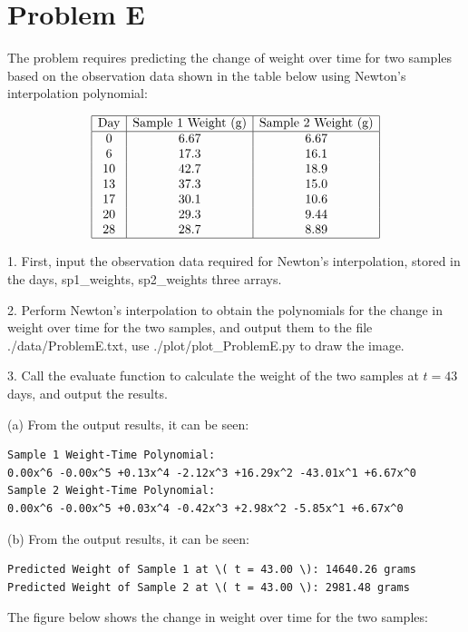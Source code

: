 \documentclass[a4paper]{article}
\begin{document}
\newpage
\section*{Problem E}

The problem requires predicting the change of weight over time for two samples based on the observation data shown in the table below using Newton's interpolation polynomial:

\[
\begin{array}{|c|c|c|}
\hline
\text{Day} & \text{Sample 1 Weight (g)} & \text{Sample 2 Weight (g)} \\
\hline
0 & 6.67 & 6.67 \\
6 & 17.3 & 16.1 \\
10 & 42.7 & 18.9 \\
13 & 37.3 & 15.0 \\
17 & 30.1 & 10.6 \\
20 & 29.3 & 9.44 \\
28 & 28.7 & 8.89 \\
\hline
\end{array}
\]

1. First, input the observation data required for Newton's interpolation, stored in the days, sp1\_weights, sp2\_weights three arrays.

2. Perform Newton's interpolation to obtain the polynomials for the change in weight over time for the two samples, and output them to the file ./data/ProblemE.txt, use ./plot/plot\_ProblemE.py to draw the image.

3. Call the evaluate function to calculate the weight of the two samples at \( t = 43 \) days, and output the results.

(a) From the output results, it can be seen:
\begin{verbatim}
Sample 1 Weight-Time Polynomial:
0.00x^6 -0.00x^5 +0.13x^4 -2.12x^3 +16.29x^2 -43.01x^1 +6.67x^0
Sample 2 Weight-Time Polynomial:
0.00x^6 -0.00x^5 +0.03x^4 -0.42x^3 +2.98x^2 -5.85x^1 +6.67x^0
\end{verbatim}


(b) From the output results, it can be seen:
\begin{verbatim}
Predicted Weight of Sample 1 at \( t = 43.00 \): 14640.26 grams
Predicted Weight of Sample 2 at \( t = 43.00 \): 2981.48 grams
\end{verbatim}


The figure below shows the change in weight over time for the two samples:
\end{document}

